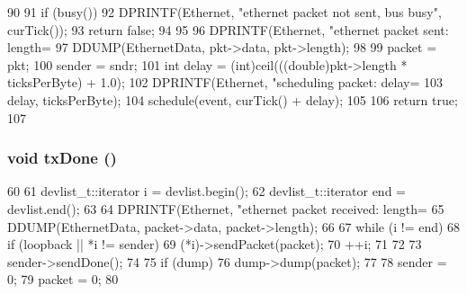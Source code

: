 \begin{DoxyCode}
90 {
91     if (busy()) {
92         DPRINTF(Ethernet, "ethernet packet not sent, bus busy\n", curTick());
93         return false;
94     }
95 
96     DPRINTF(Ethernet, "ethernet packet sent: length=%
97     DDUMP(EthernetData, pkt->data, pkt->length);
98 
99     packet = pkt;
100     sender = sndr;
101     int delay = (int)ceil(((double)pkt->length * ticksPerByte) + 1.0);
102     DPRINTF(Ethernet, "scheduling packet: delay=%
103             delay, ticksPerByte);
104     schedule(event, curTick() + delay);
105 
106     return true;
107 }
\end{DoxyCode}
\hypertarget{classEtherBus_ac06188e141ad966d9d760cfcfc258587}{
\subsubsection[{txDone}]{\setlength{\rightskip}{0pt plus 5cm}void txDone ()}}
\label{classEtherBus_ac06188e141ad966d9d760cfcfc258587}



\begin{DoxyCode}
60 {
61     devlist_t::iterator i = devlist.begin();
62     devlist_t::iterator end = devlist.end();
63 
64     DPRINTF(Ethernet, "ethernet packet received: length=%
65     DDUMP(EthernetData, packet->data, packet->length);
66 
67     while (i != end) {
68         if (loopback || *i != sender)
69             (*i)->sendPacket(packet);
70         ++i;
71     }
72 
73     sender->sendDone();
74 
75     if (dump)
76         dump->dump(packet);
77 
78     sender = 0;
79     packet = 0;
80 }
\end{DoxyCode}


